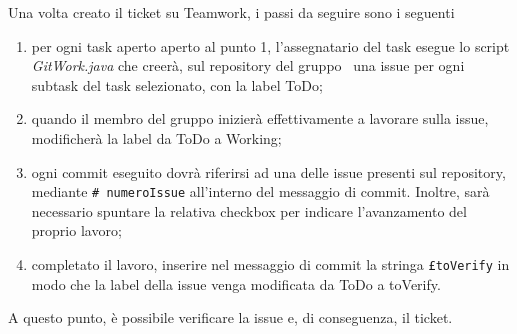 \documentclass[../NormeProgetto.tex]{subfiles}
\begin{document}
			Una volta creato il ticket su Teamwork, i passi da seguire sono i seguenti			
				\begin{enumerate}
					\item per ogni task aperto aperto al punto 1, l'assegnatario del task esegue lo script \textit{GitWork.java} che creerà, sul repository del gruppo \leaf\ una issue per ogni subtask del task selezionato, con la label ToDo;
					\item quando il membro del gruppo inizierà effettivamente a lavorare sulla issue, modificherà la label da ToDo a Working;
					\item ogni commit eseguito dovrà riferirsi ad una delle issue presenti sul repository, mediante \texttt{\# numeroIssue} all'interno del messaggio di commit. Inoltre, sarà necessario spuntare la relativa checkbox per indicare l'avanzamento del proprio lavoro;
					\item completato il lavoro, inserire nel messaggio di commit la stringa \texttt{£toVerify} in modo che la label della issue venga modificata da ToDo a toVerify.
				\end{enumerate}
			A questo punto, è possibile verificare la issue e, di conseguenza, il ticket.
\end{document}
